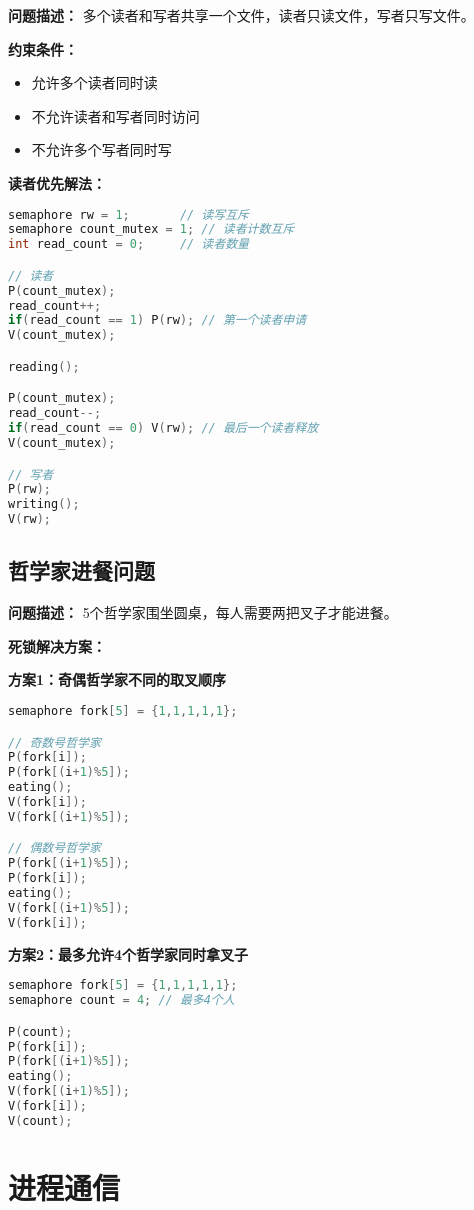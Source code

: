 \documentclass[lang=cn,newtx,10pt,scheme=chinese]{../../elegantbook}
\begin{document}
\textbf{问题描述：}
多个读者和写者共享一个文件，读者只读文件，写者只写文件。

\textbf{约束条件：}
\begin{itemize}
  \item 允许多个读者同时读
  \item 不允许读者和写者同时访问
  \item 不允许多个写者同时写
\end{itemize}

\textbf{读者优先解法：}
\begin{lstlisting}[language=C]
semaphore rw = 1;       // 读写互斥
semaphore count_mutex = 1; // 读者计数互斥
int read_count = 0;     // 读者数量

// 读者
P(count_mutex);
read_count++;
if(read_count == 1) P(rw); // 第一个读者申请
V(count_mutex);

reading();

P(count_mutex);
read_count--;
if(read_count == 0) V(rw); // 最后一个读者释放
V(count_mutex);

// 写者
P(rw);
writing();
V(rw);
\end{lstlisting}

\subsection{哲学家进餐问题}

\textbf{问题描述：}
5个哲学家围坐圆桌，每人需要两把叉子才能进餐。

\textbf{死锁解决方案：}

\textbf{方案1：奇偶哲学家不同的取叉顺序}
\begin{lstlisting}[language=C]
semaphore fork[5] = {1,1,1,1,1};

// 奇数号哲学家
P(fork[i]);
P(fork[(i+1)%5]);
eating();
V(fork[i]);
V(fork[(i+1)%5]);

// 偶数号哲学家
P(fork[(i+1)%5]);
P(fork[i]);
eating();
V(fork[(i+1)%5]);
V(fork[i]);
\end{lstlisting}
\textbf{方案2：最多允许4个哲学家同时拿叉子}
\begin{lstlisting}[language=C]
semaphore fork[5] = {1,1,1,1,1};
semaphore count = 4; // 最多4个人

P(count);
P(fork[i]);
P(fork[(i+1)%5]);
eating();
V(fork[(i+1)%5]);
V(fork[i]);
V(count);
\end{lstlisting}

\section{进程通信}
\end{document}
